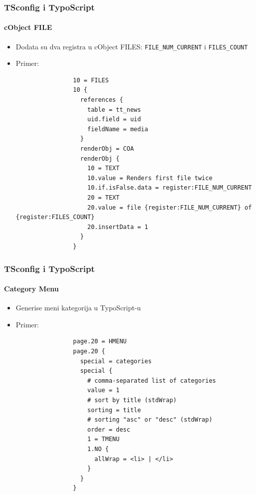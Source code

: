 
\begin{frame}[fragile]
	\frametitle{TSconfig i TypoScript}
	\framesubtitle{cObject FILE}

	\begin{itemize}
		\item Dodata su dva registra u cObject FILES:\newline
			\texttt{FILE\_NUM\_CURRENT} i \texttt{FILES\_COUNT}

		\item Primer:

			\lstset{
				basicstyle=\tiny\ttfamily
			}

			\begin{lstlisting}
				10 = FILES
				10 {
				  references {
				    table = tt_news
				    uid.field = uid
				    fieldName = media
				  }
				  renderObj = COA
				  renderObj {
				    10 = TEXT
				    10.value = Renders first file twice
				    10.if.isFalse.data = register:FILE_NUM_CURRENT
				    20 = TEXT
				    20.value = file {register:FILE_NUM_CURRENT} of {register:FILES_COUNT}
				    20.insertData = 1
				  }
				}
			\end{lstlisting}

	\end{itemize}

\end{frame}


\begin{frame}[fragile]
	\frametitle{TSconfig i TypoScript}
	\framesubtitle{Category Menu}

	\begin{itemize}
		\item Generise meni kategorija u TypoScript-u

		\item Primer:

			\lstset{
				basicstyle=\tiny\ttfamily
			}

			\begin{lstlisting}
				page.20 = HMENU
				page.20 {
				  special = categories
				  special {
				    # comma-separated list of categories
				    value = 1
				    # sort by title (stdWrap)
				    sorting = title
				    # sorting "asc" or "desc" (stdWrap)
				    order = desc
				    1 = TMENU
				    1.NO {
				      allWrap = <li> | </li>
				    }
				  }
				}
			\end{lstlisting}

	\end{itemize}

\end{frame}

